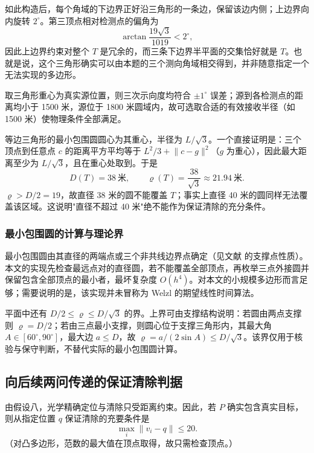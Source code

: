 如此构造后，每个角域的下边界正好沿三角形的一条边，保留该边内侧；上边界向内旋转 $2^\circ$。第三顶点相对检测点的偏角为
\begin{equation}
  \arctan\frac{19\sqrt3}{1019}<2^\circ ,
\end{equation}
因此上边界约束对整个 $T$ 是冗余的，而三条下边界半平面的交集恰好就是 $T$。也就是说，这个三角形确实可以由本题的三个测向角域相交得到，并非随意指定一个无法实现的多边形。

取三角形重心为真实源位置，则三次示向度均符合 $\pm1^\circ$ 误差；源到各检测点的距离均小于 1500 米，源位于 1800 米圆域内，故可选取合适的有效接收半径（如 1500 米）使物理条件全部满足。

等边三角形的最小包围圆圆心为其重心，半径为 $L/\sqrt3$。一个直接证明是：三个顶点到任意点 $c$ 的距离平方平均等于 $L^2/3+\lVert c-g\rVert^2$（$g$ 为重心），因此最大距离至少为 $L/\sqrt3$，且在重心处取到。于是
\begin{equation}
  D(T)=38\ \text{米},\qquad \varrho(T)=\frac{38}{\sqrt3}\approx21.94\ \text{米}.
  \label{eq:counterexample}
\end{equation}
$\varrho>D/2=19$，故直径 38 米的圆不能覆盖 $T$；事实上直径 40 米的圆同样无法覆盖该区域。这说明"直径不超过 40 米"绝不能作为保证清除的充分条件。

\subsubsection{最小包围圆的计算与理论界}

最小包围圆由其直径的两端点或三个非共线边界点确定（见文献 \cite{Welzl1991} 的支撑点性质）。本文的实现先检查最远点对的直径圆，若不能覆盖全部顶点，再枚举三点外接圆并保留包含全部顶点的最小者，最坏复杂度 $O(h^4)$。对本文的小规模多边形而言足够；需要说明的是，该实现并未冒称为 Welzl 的期望线性时间算法。

平面中还有 $D/2\le\varrho\le D/\sqrt3$ 的界。上界可由支撑结构说明：若圆由两点支撑则 $\varrho=D/2$；若由三点最小支撑，则圆心位于支撑三角形内，其最大角 $A\in[60^\circ,90^\circ]$，最大边 $a\le D$，故 $\varrho=a/(2\sin A)\le D/\sqrt3$。该界仅用于核验与保守判断，不替代实际的最小包围圆计算。

\subsection{向后续两问传递的保证清除判据}

由假设八，光学精确定位与清除只受距离约束。因此，若 $P$ 确实包含真实目标，则从指定位置 $q$ 保证清除的充要条件是
\begin{equation}
  \max_i\lVert v_i-q\rVert\le20 .
  \label{eq:clear-condition}
\end{equation}
（对凸多边形，范数的最大值在顶点取得，故只需检查顶点。）


